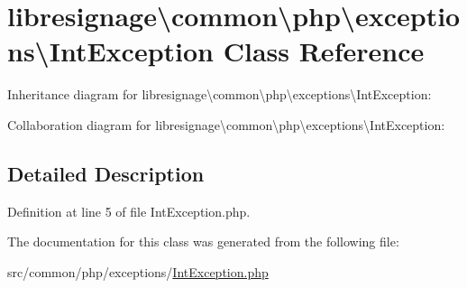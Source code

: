 \hypertarget{classlibresignage_1_1common_1_1php_1_1exceptions_1_1IntException}{}\section{libresignage\textbackslash{}common\textbackslash{}php\textbackslash{}exceptions\textbackslash{}Int\+Exception Class Reference}
\label{classlibresignage_1_1common_1_1php_1_1exceptions_1_1IntException}


Inheritance diagram for libresignage\textbackslash{}common\textbackslash{}php\textbackslash{}exceptions\textbackslash{}Int\+Exception\+:


Collaboration diagram for libresignage\textbackslash{}common\textbackslash{}php\textbackslash{}exceptions\textbackslash{}Int\+Exception\+:


\subsection{Detailed Description}


Definition at line 5 of file Int\+Exception.\+php.



The documentation for this class was generated from the following file\+:\begin{DoxyCompactItemize}
\item 
src/common/php/exceptions/\hyperlink{IntException_8php}{Int\+Exception.\+php}\end{DoxyCompactItemize}
